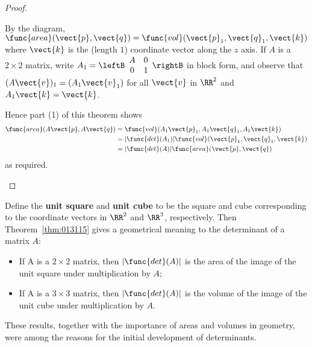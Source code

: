 \begin{proof}
\begin{enumerate}
By the diagram, $\func{area}(\vect{p}, \vect{q}) = \func{vol}(\vect{p}_{1}, \vect{q}_{1}, \vect{k})$ where $\vect{k}$ is the (length $1$) coordinate vector along the $z$ axis. If $A$ is a $2 \times 2$ matrix, write $A_{1} = \leftB
\begin{array}{cc}
A & 0 \\
0 & 1
\end{array}
\rightB$ in block form, and observe that $(A\vect{v})_{1} = (A_{1}\vect{v}_{1})$ for all $\vect{v}$ in $\RR^2$ and $A_{1}\vect{k} = \vect{k}$.




 Hence part (1) of this theorem shows
\begin{align*}
\func{area}(A\vect{p}, A\vect{q})
&= \func{vol}(A_{1}\vect{p}_{1}, A_{1}\vect{q}_{1}, A_{1}\vect{k}) \\
&= |\func{det}(A_{1})|\func{vol}(\vect{p}_{1}, \vect{q}_{1}, \vect{k})\\
&= |\func{det}(A)|\func{area}(\vect{p}, \vect{q})
\end{align*}
as required.
\end{enumerate}
\end{proof}

Define the \textbf{unit square} and \textbf{unit cube} to be the square and cube corresponding to the coordinate vectors in $\RR^2$ and $\RR^3$, respectively. Then Theorem~\ref{thm:013115} gives a geometrical meaning to the determinant of a matrix $A$:

\begin{itemize}
\item If A is a $2 \times 2$ matrix, then $|\func{det}(A)|$ is the area of the image of the unit square under multiplication by $A$;

\item If A is a $3 \times 3$ matrix, then $|\func{det}(A)|$ is the volume of the image of the unit cube under multiplication by $A$.

\end{itemize}

\noindent These results, together with the importance of areas and volumes in geometry,
 were among the reasons for the initial development of determinants.

